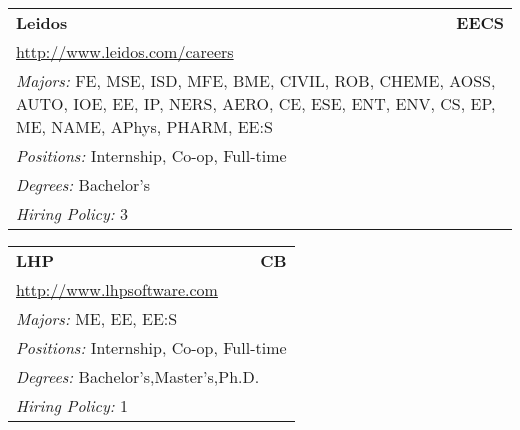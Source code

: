 \documentclass[twoside]{article}
\begin{document}
\begin{center}
\begin{multicols}{3}
\begin{FlushLeft}
\begin{minipage}{\columnwidth}
\end{minipage}
 
\begin{minipage}{\columnwidth}\begin{tabularx}{.95\columnwidth}{Xr}
                 {\Large\bf Leidos} & {\Large\bf EECS}\\
    \multicolumn{2}{p{.95\columnwidth}}{\url{http://www.leidos.com/careers}}\\
    \multicolumn{2}{p{.95\columnwidth}}{\emph{Majors:} FE, MSE, ISD, MFE, BME, CIVIL, ROB, CHEME, AOSS, AUTO, IOE, EE, IP, NERS, AERO, CE, ESE, ENT, ENV, CS, EP, ME, NAME, APhys, PHARM, EE:S}\\
    \multicolumn{2}{p{.95\columnwidth}}{\emph{Positions:} Internship, Co-op, Full-time}\\
    \multicolumn{2}{p{.95\columnwidth}}{\emph{Degrees:} Bachelor's}\\
    \multicolumn{2}{p{.95\columnwidth}}{\emph{Hiring Policy:} 3}\\
    \end{tabularx}
    
\end{minipage}
 
\begin{minipage}{\columnwidth}\begin{tabularx}{.95\columnwidth}{Xr}
                 {\Large\bf LHP} & {\Large\bf CB}\\
    \multicolumn{2}{p{.95\columnwidth}}{\url{http://www.lhpsoftware.com}}\\
    \multicolumn{2}{p{.95\columnwidth}}{\emph{Majors:} ME, EE, EE:S}\\
    \multicolumn{2}{p{.95\columnwidth}}{\emph{Positions:} Internship, Co-op, Full-time}\\
    \multicolumn{2}{p{.95\columnwidth}}{\emph{Degrees:} Bachelor's,Master's,Ph.D.}\\
    \multicolumn{2}{p{.95\columnwidth}}{\emph{Hiring Policy:} 1}\\
    \end{tabularx}
    
\end{minipage}
 

\end{FlushLeft}
\end{multicols}
\end{center}
\end{document}
